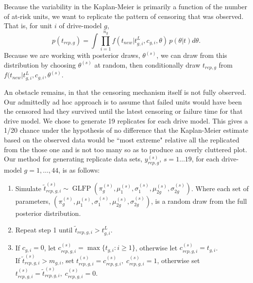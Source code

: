 \documentclass[12pt]{article}
\newcommand{\op}{\operatorname}
\begin{document}


Because the variability in the Kaplan-Meier is primarily a function of the number of at-risk units, we want to replicate the pattern of censoring that was observed. That is, for unit $i$ of drive-model $g$,
$$p(t_{rep,g}) = \int \prod_{i=1}^{n_g}f(t_{new}|t_{g,i}^L,c_{g,i},\theta)\,p(\theta|t)d\theta.$$
Because we are working with posterior draws, $\theta^{(s)}$, we can draw from this distribution by choosing $\theta^{(s)}$ at random, then conditionally draw $t_{rep,g}$ from $f(t_{new}|t_{g,i}^L,c_{g,i},\theta^{(s)}.$

An obstacle remains, in that the censoring mechanism itself is not fully observed. Our admittedly ad hoc approach is to assume that failed units would have been the censored had they survived until the latest censoring or failure time for that drive model. We chose to generate 19 replicates for each drive model. This gives a 1/20 chance under the hypothesis of no difference that the Kaplan-Meier estimate based on the observed data would be ``most extreme" relative all the replicated  from the those one and is not too many so as to produce an overly cluttered plot. Our method for generating replicate data sets, $y_{rep,g}^{(s)}$, $s = 1 \dots 19$, for each drive-model $g=1,\ldots,44$, is as follows:
\begin{enumerate}
\item Simulate $\tilde{t}_{rep,g,i}^{(s)} \sim \op{GLFP}(\pi_{g}^{(s)},\mu_1^{(s)},\sigma_1^{(s)},\mu_{2g}^{(s)}, \sigma_{2g}^{(s)})$.  Where each set of parameters, $\left( \pi_{g}^{(s)},\mu_1^{(s)},\sigma_1^{(s)},\mu_{2g}^{(s)}, \sigma_{2g}^{(s)} \right) $, is a random draw from the full posterior distribution.
\item Repeat step 1 until $\tilde{t}_{rep,g,i} > t_{g,i}^L$.
\item If $c_{g,i}=0$, let $c_{rep,g,i}^{(s)}=\max \{t_{g,i}: i \ge 1\}$, otherwise let $c_{rep,g,i}^{(s)}=t_{g,i}$.\\
If $\tilde{t}_{rep,g,i}^{(s)}>m_{g,i}$, set $t_{rep,g,i}^{(s)}=c_{rep,g,i}^{(s)},\; c_{rep,g,i}^{(s)}=1$, otherwise set $t_{rep,g,i}^{(s)}=\tilde{t}_{rep,g,i}^{(s)},\; c_{rep,g,i}^{(s)}=0$.
\end{enumerate}
\end{document}
